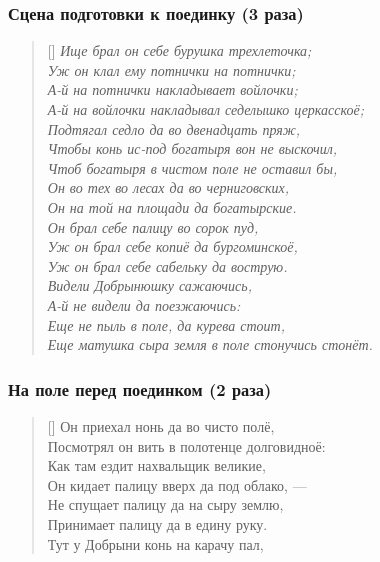 \documentclass[a4paper, 12pt]{article}
\begin{document}
\subsubsection{Сцена подготовки к поединку (3 раза)}
\settowidth{\versewidth}{А-й на войлочки накладывал седелышко церка}
\begin{verse}[\versewidth]
\itshape
Ище брал он себе бурушка трехлеточка;\\
Уж он клал ему потнички на потнички;\\
А-й на потнички накладывает войлочки;\\
А-й на войлочки накладывал седелышко церкасскоё;\\
Подтягал седло да во двенадцать пряж,\\
Чтобы конь ис-под богатыря вон не выскочил,\\
Чтоб богатыря в чистом поле не оставил бы,\\
Он во тех во лесах да во черниговских,\\
Он на той на площади да богатырские.\\
Он брал себе палицу во сорок пуд,\\
Уж он брал себе копиё да бургоминскоё,\\
Уж он брал себе сабельку да вострую.\\
Видели Добрынюшку сажаючись,\\
А-й не видели да поезжаючись:\\
Еще не пыль в поле, да курева стоит,\\
Еще матушка сыра земля в поле стонучись стонёт.\\
\end{verse}

\subsubsection{На поле перед поединком (2 раза)}
\settowidth{\versewidth}{Посмотрял он вить в полотенце долговидноё:}
\begin{verse}[\versewidth]
Он приехал нонь да во чисто полё,\\
Посмотрял он вить в полотенце долговидноё:\\
Как там ездит нахвальщик великие,\\
Он кидает палицу вверх да под облако, —\\
Не спущает палицу да на сыру землю,\\
Принимает палицу да в едину руку.\\
Тут у Добрыни конь на карачу пал,\\
\end{verse}
\end{document}
